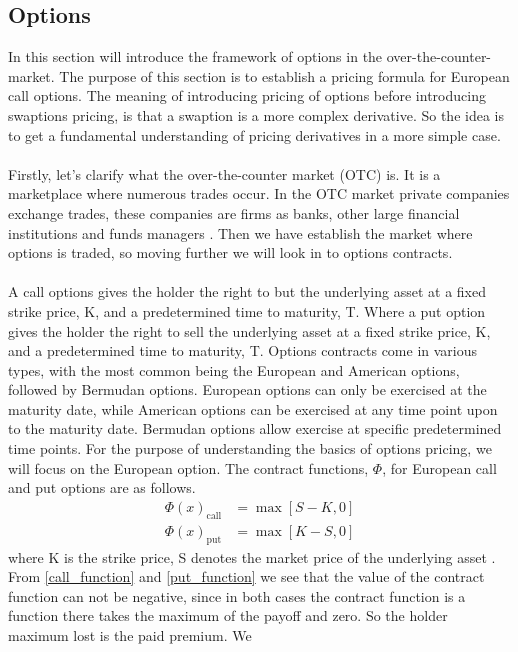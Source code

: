 \subsection{Options}
In this section will introduce the framework of options in the over-the-counter-market. 
The purpose of this section is to establish a pricing formula for European call options.
The meaning of introducing pricing of options before introducing swaptions pricing, is that a swaption is  a 
more complex derivative. So the idea is to get a fundamental understanding of pricing derivatives in a more simple case.
\\\\
Firstly, let's clarify what the over-the-counter market (OTC) is. It is  a marketplace where numerous trades occur.
In the OTC market private companies exchange trades, these companies are firms as banks, other 
large financial institutions and funds managers \cite{Hull}. Then we have establish the market where 
options is traded, so moving further we will look in to options contracts. 
\\\\
A call options gives the holder the right to but the underlying asset at a fixed strike price, K, and a 
predetermined time to maturity, T. Where a put option gives the holder the right to sell the underlying asset at a fixed
strike price, K, and a predetermined time to maturity, T. Options contracts come in various types, with the 
most common being the European and American options, followed by Bermudan options. European options can only 
be exercised at the maturity date, while American options can be exercised at any time point upon to the maturity date.
Bermudan options allow exercise at specific predetermined time points.
For the purpose of understanding the basics of options pricing, we will focus on the European option. 
The contract functions, $\Phi$, for European call and put options are as follows.
\begin{align}
    \Phi(x)_{\text{call}} &=  \max[S-K,0] \label{call_function}\\ 
    \Phi(x)_{\text{put}} &= \max [K-S,0] \label{put_function}
\end{align}
where K is the strike price, S denotes the market price of the underlying asset \cite{Bjork}. From \autoref{call_function} and \autoref{put_function} we see
that the value of the contract function can not be negative, since in both cases the contract function is a 
function there takes the maximum of the payoff and zero. So the holder maximum lost is the paid premium. 
We 
